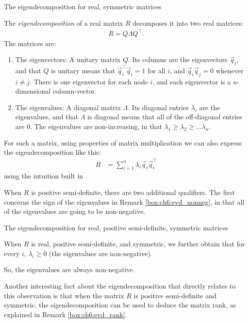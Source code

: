 \begin{floatingbox}[h]\caption{The eigendecomposition for real, symmetric matrices}
\label{box:ch6:evd}
The \textit{eigendecomposition} of a real matrix $R$ decomposes it into two real matrices:
\begin{align*}
    R = Q\Lambda Q^\top.
\end{align*}
The matrices are:
\begin{enumerate}
    \item The eigenvectors: A unitary matrix $Q$. Its columns are the eigenvectors $\vec q_i$, and that $Q$ is unitary means that $\vec q_i^\top \vec q_i = 1$ for all $i$, and $\vec q_i \vec q_j = 0$ whenever $i \neq j$. There is one eigenvector for each node $i$, and each eigenvector is a $n$-dimensional column-vector.
    \item The eigenvalues: A diagonal matrix $\Lambda$. Its diagonal entries $\lambda_{i}$ are the eigenvalues, and that $\Lambda$ is diagonal means that all of the off-diagonal entries are $0$. The eigenvalues are non-increasing, in that $\lambda_1 \geq \lambda_2 \geq \hdots \lambda_n$. 
\end{enumerate}
\end{floatingbox}
For such a matrix, using properties of matrix multiplication we can also express the eigendecomposition like this:
\begin{align*}
    R &= \sum_{i = 1}^n \lambda_{i}\vec q_i \vec q_i^\top
\end{align*}
using the intuition built in \cite{Trefethen1997}. 

When $R$ is positive semi-definite, there are two additional qualifiers. The first concerns the sign of the eigenvalues in Remark \ref{box:ch6:evd_nonneg}, in that all of the eigenvalues are going to be non-negative.
\begin{floatingbox}[h]\caption{The eigendecomposition for real, positive semi-definite, symmetric matrices}
\label{box:ch6:evd_nonneg}
When $R$ is real, positive semi-definite, and symmetric, we further obtain that for every $i$, $\lambda_{i}\geq 0$ (the eigenvalues are non-negative).
\end{floatingbox}
So, the eigenvalues are always non-negative.

Another interesting fact about the eigendecomposition that directly relates to this observation is that when the matrix $R$ is positive semi-definite and symmetric, the eigendecomposition can be used to deduce the matrix rank, as explained in Remark \ref{box:ch6:evd_rank}.

